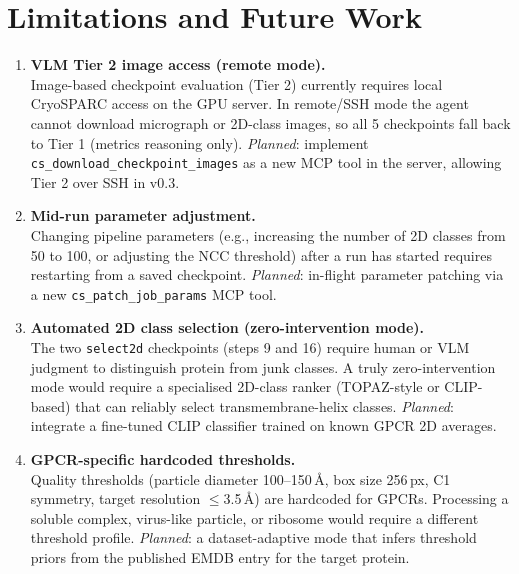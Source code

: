 \documentclass[12pt, a4paper]{article}
\begin{document}
\section{Limitations and Future Work}
\label{sec:limitations}

\begin{enumerate}[leftmargin=1.6em, label=\textbf{L\arabic*.}, itemsep=8pt]

\item \textbf{VLM Tier 2 image access (remote mode).}\\
Image-based checkpoint evaluation (Tier 2) currently requires local
CryoSPARC access on the GPU server.
In remote/SSH mode the agent cannot download micrograph or 2D-class images,
so all 5 checkpoints fall back to Tier 1 (metrics reasoning only).
\textit{Planned}: implement \texttt{cs\_download\_checkpoint\_images} as a
new MCP tool in the server, allowing Tier 2 over SSH in v0.3.

\item \textbf{Mid-run parameter adjustment.}\\
Changing pipeline parameters (e.g., increasing the number of 2D classes from
50 to 100, or adjusting the NCC threshold) after a run has started requires
restarting from a saved checkpoint.
\textit{Planned}: in-flight parameter patching via a new
\texttt{cs\_patch\_job\_params} MCP tool.

\item \textbf{Automated 2D class selection (zero-intervention mode).}\\
The two \texttt{select2d} checkpoints (steps 9 and 16) require human or VLM
judgment to distinguish protein from junk classes.
A truly zero-intervention mode would require a specialised 2D-class ranker
(TOPAZ-style or CLIP-based) that can reliably select transmembrane-helix
classes.
\textit{Planned}: integrate a fine-tuned CLIP classifier trained on known GPCR
2D averages.

\item \textbf{GPCR-specific hardcoded thresholds.}\\
Quality thresholds (particle diameter 100--150\,\AA, box size 256\,px,
C1 symmetry, target resolution $\leq$3.5\,\AA) are hardcoded for GPCRs.
Processing a soluble complex, virus-like particle, or ribosome would require
a different threshold profile.
\textit{Planned}: a dataset-adaptive mode that infers threshold priors from
the published EMDB entry for the target protein.


\end{enumerate}
\end{document}
